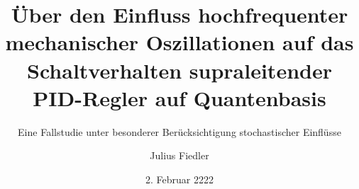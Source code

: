 \documentclass[arbeit=studie,oneside,BCOR=12mm]{ArbeitRST}
\begin{document}

\author{Julius Fiedler}



\title{Über den Einfluss hochfrequenter mechanischer Oszillationen auf das Schaltverhalten supraleitender PID-Regler auf Quantenbasis}

\subtitle{Eine Fallstudie unter besonderer Berücksichtigung stochastischer Einflüsse}


\date{2. Februar 2222}


\pagestyle{plain}


\maketitle





\selbststaendigkeitserklaerung




\tableofcontents



\listoffigures


\listoftables



\end{document}
